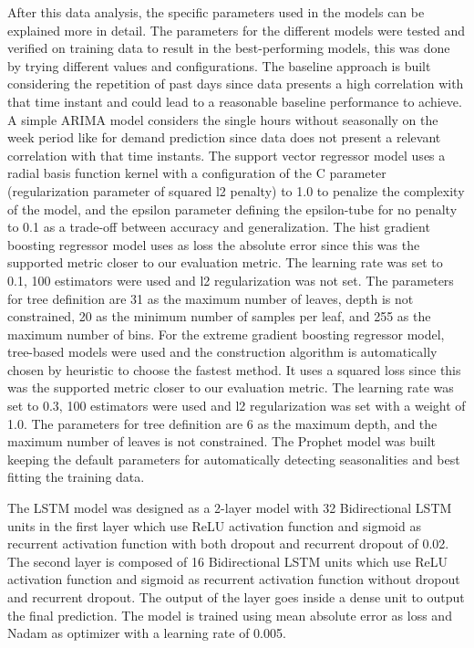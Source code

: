 After this data analysis, the specific parameters used in the models can be explained more in detail.
The parameters for the different models were tested and verified on training data to result in the best-performing models, this was done by trying different values and configurations.
The baseline approach is built considering the repetition of past days since data presents a high correlation with that time instant and could lead to a reasonable baseline performance to achieve.
A simple ARIMA model considers the single hours without seasonally on the week period like for demand prediction since data does not present a relevant correlation with that time instants.
The support vector regressor model uses a radial basis function kernel with a configuration of the C parameter (regularization parameter of squared l2 penalty) to 1.0 to penalize the complexity of the model, and the epsilon parameter defining the epsilon-tube for no penalty to 0.1 as a trade-off between accuracy and generalization.
The hist gradient boosting regressor model uses as loss the absolute error since this was the supported metric closer to our evaluation metric.
The learning rate was set to 0.1, 100 estimators were used and l2 regularization was not set.
The parameters for tree definition are 31 as the maximum number of leaves, depth is not constrained, 20 as the minimum number of samples per leaf, and 255 as the maximum number of bins.
For the extreme gradient boosting regressor model, tree-based models were used and the construction algorithm is automatically chosen by heuristic to choose the fastest method.
It uses a squared loss since this was the supported metric closer to our evaluation metric.
The learning rate was set to 0.3, 100 estimators were used and l2 regularization was set with a weight of 1.0.
The parameters for tree definition are 6 as the maximum depth, and the maximum number of leaves is not constrained.
The Prophet model was built keeping the default parameters for automatically detecting seasonalities and best fitting the training data.

The LSTM model was designed as a 2-layer model with 32 Bidirectional LSTM units in the first layer which use ReLU activation function and sigmoid as recurrent activation function with both dropout and recurrent dropout of 0.02.
The second layer is composed of 16 Bidirectional LSTM units which use ReLU activation function and sigmoid as recurrent activation function without dropout and recurrent dropout.
The output of the layer goes inside a dense unit to output the final prediction.
The model is trained using mean absolute error as loss and Nadam as optimizer with a learning rate of 0.005.

